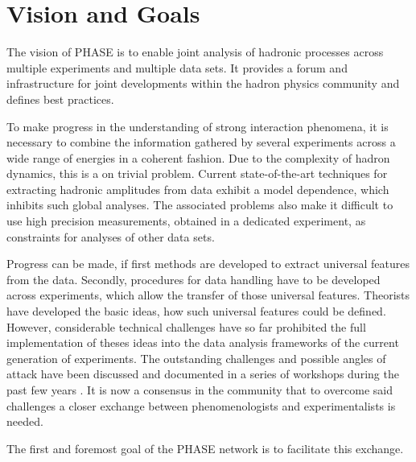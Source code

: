 \section{Vision and Goals}

The vision of PHASE is to enable joint analysis of hadronic processes across multiple experiments and multiple data sets. It provides a forum and infrastructure for joint developments within the hadron physics community and defines best practices.

To make progress in the understanding of strong interaction phenomena, it is necessary to combine the information gathered by several experiments across a wide range of energies in a coherent fashion. Due to the complexity of hadron dynamics, this is a on trivial problem. Current state-of-the-art techniques for extracting hadronic amplitudes from data exhibit a model dependence, which inhibits such global analyses. The associated problems also make it difficult to use high precision measurements, obtained in a dedicated experiment, as constraints for analyses of other data sets. 

Progress can be made, if first methods are developed to extract universal features from the data. Secondly, procedures for data handling have to be developed across experiments, which allow the transfer of those universal features. Theorists have developed the basic ideas, how such universal features could be defined. However, considerable technical challenges have so far prohibited the full implementation of theses ideas into the data analysis frameworks of the current generation of experiments. The outstanding challenges and possible angles of attack have been discussed and documented in a series of workshops during the past few years \cite{Battaglieri_2015, Brice_o_2016, Lutz_2016}. It is now a consensus in the community that to overcome said challenges a closer exchange between phenomenologists and experimentalists is needed.

The first and foremost goal of the PHASE network is to facilitate this exchange. 




